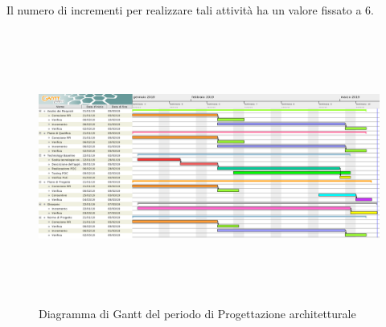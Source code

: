 Il numero di incrementi per realizzare tali attività ha un valore fissato a 6.

\begin{figure}[H]
	\centering
	\hspace*{-1.5cm}
		\includegraphics[width=19.4cm, height=9cm]{Pianificazione/Progettazione.pdf}
	\caption{Diagramma di Gantt del periodo di Progettazione architetturale}
\end{figure}